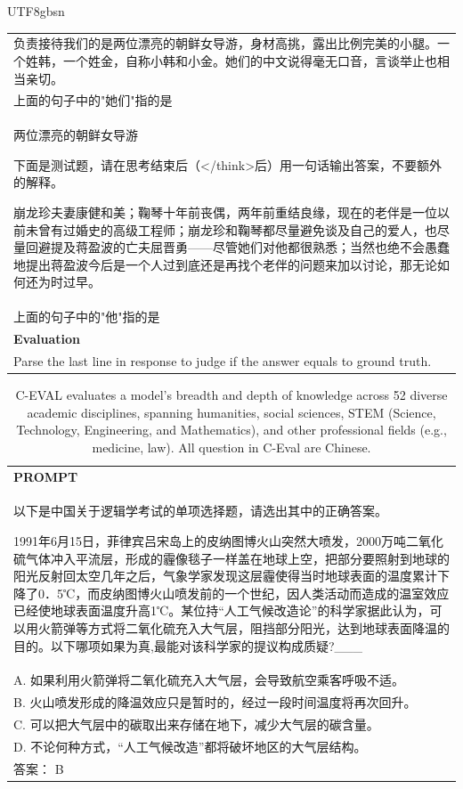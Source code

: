 \documentclass[11pt, a4paper, logo, copyright, nonumbering]{deepseek}
\begin{document}
\begin{CJK*}{UTF8}{gbsn}
\begin{table}[h]
\begin{tabular}{p{}}
负责接待我们的是两位漂亮的朝鲜女导游，身材高挑，露出比例完美的小腿。一个姓韩，一个姓金，自称小韩和小金。她们的中文说得毫无口音，言谈举止也相当亲切。\\
上面的句子中的"她们"指的是 \\
两位漂亮的朝鲜女导游

下面是测试题，请在思考结束后（</think>后）用一句话输出答案，不要额外的解释。

崩龙珍夫妻康健和美；鞠琴十年前丧偶，两年前重结良缘，现在的老伴是一位以前未曾有过婚史的高级工程师；崩龙珍和鞠琴都尽量避免谈及自己的爱人，也尽量回避提及蒋盈波的亡夫屈晋勇——尽管她们对他都很熟悉；当然也绝不会愚蠢地提出蒋盈波今后是一个人过到底还是再找个老伴的问题来加以讨论，那无论如何还为时过早。\\
上面的句子中的"他"指的是
\\ \hline
      \textbf{Evaluation}\\
      Parse the last line in response to judge if the answer equals to ground truth.
       \\ \hline
    \end{tabular}
\end{table}

\begin{table}[h]
    \centering \small
        \caption{C-EVAL evaluates a model's breadth and depth of knowledge across 52 diverse academic disciplines, spanning humanities, social sciences, STEM (Science, Technology, Engineering, and Mathematics), and other professional fields (e.g., medicine, law). All question in C-Eval are Chinese. }
    \label{tab:ceval_eval_format_example}
    \begin{tabular}{p{}}
    \hline
    \textbf{PROMPT}\\
以下是中国关于逻辑学考试的单项选择题，请选出其中的正确答案。

1991年6月15日，菲律宾吕宋岛上的皮纳图博火山突然大喷发，2000万吨二氧化硫气体冲入平流层，形成的霾像毯子一样盖在地球上空，把部分要照射到地球的阳光反射回太空几年之后，气象学家发现这层霾使得当时地球表面的温度累计下降了0．5℃，而皮纳图博火山喷发前的一个世纪，因人类活动而造成的温室效应已经使地球表面温度升高1℃。某位持“人工气候改造论”的科学家据此认为，可以用火箭弹等方式将二氧化硫充入大气层，阻挡部分阳光，达到地球表面降温的目的。以下哪项如果为真,最能对该科学家的提议构成质疑?\_\_\_ \\
A. 如果利用火箭弹将二氧化硫充入大气层，会导致航空乘客呼吸不适。\\
B. 火山喷发形成的降温效应只是暂时的，经过一段时间温度将再次回升。\\
C. 可以把大气层中的碳取出来存储在地下，减少大气层的碳含量。\\
D. 不论何种方式，“人工气候改造”都将破坏地区的大气层结构。\\
答案： B


\end{tabular}
\end{table}
\end{CJK*}
\end{document}
